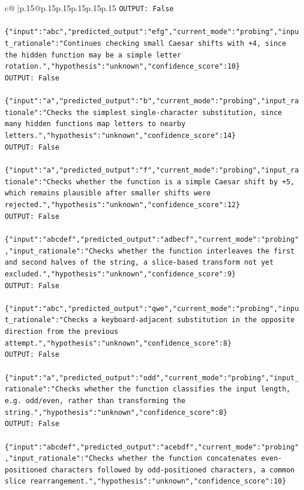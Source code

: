 \documentclass{article}
\begin{document}
{\begin{supertabular}{c@{$\;$}|p{.15\linewidth}@{}p{.15\linewidth}p{.15\linewidth}p{.15\linewidth}p{.15\linewidth}p{.15\linewidth}}
{{{\texttt{OUTPUT: False} \\
\\ 
\texttt{\{"input":"abc","predicted\_output":"efg","current\_mode":"probing","input\_rationale":"Continues checking small Caesar shifts with +4, since the hidden function may be a simple letter rotation.","hypothesis":"unknown","confidence\_score":10\}} \\
\texttt{OUTPUT: False} \\
\\ 
\texttt{\{"input":"a","predicted\_output":"b","current\_mode":"probing","input\_rationale":"Checks the simplest single{-}character substitution, since many hidden functions map letters to nearby letters.","hypothesis":"unknown","confidence\_score":14\}} \\
\texttt{OUTPUT: False} \\
\\ 
\texttt{\{"input":"a","predicted\_output":"f","current\_mode":"probing","input\_rationale":"Checks whether the function is a simple Caesar shift by +5, which remains plausible after smaller shifts were rejected.","hypothesis":"unknown","confidence\_score":12\}} \\
\texttt{OUTPUT: False} \\
\\ 
\texttt{\{"input":"abcdef","predicted\_output":"adbecf","current\_mode":"probing","input\_rationale":"Checks whether the function interleaves the first and second halves of the string, a slice{-}based transform not yet excluded.","hypothesis":"unknown","confidence\_score":9\}} \\
\texttt{OUTPUT: False} \\
\\ 
\texttt{\{"input":"abc","predicted\_output":"qwe","current\_mode":"probing","input\_rationale":"Checks a keyboard{-}adjacent substitution in the opposite direction from the previous attempt.","hypothesis":"unknown","confidence\_score":8\}} \\
\texttt{OUTPUT: False} \\
\\ 
\texttt{\{"input":"a","predicted\_output":"odd","current\_mode":"probing","input\_rationale":"Checks whether the function classifies the input length, e.g. odd/even, rather than transforming the string.","hypothesis":"unknown","confidence\_score":8\}} \\
\texttt{OUTPUT: False} \\
\\ 
\texttt{\{"input":"abcdef","predicted\_output":"acebdf","current\_mode":"probing","input\_rationale":"Checks whether the function concatenates even{-}positioned characters followed by odd{-}positioned characters, a common slice rearrangement.","hypothesis":"unknown","confidence\_score":10\}} \\
}}}
\end{supertabular}}
\end{document}
